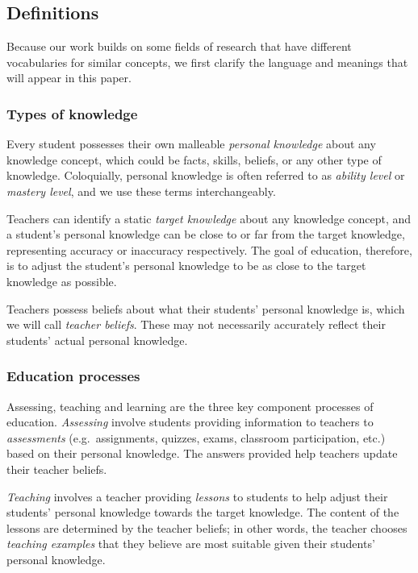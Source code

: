 \documentclass[10pt, letterpaper]{apa6}
\begin{document}
\subsection{Definitions}\label{definitions}

Because our work builds on some fields of research that have different
vocabularies for similar concepts, we first clarify the language and
meanings that will appear in this paper.

\subsubsection{Types of knowledge}\label{types-of-knowledge}

Every student possesses their own malleable \emph{personal knowledge}
about any knowledge concept, which could be facts, skills, beliefs, or
any other type of knowledge. Coloquially, personal knowledge is often
referred to as \emph{ability level} or \emph{mastery level}, and we use
these terms interchangeably.

Teachers can identify a static \emph{target knowledge} about any
knowledge concept, and a student's personal knowledge can be close to or
far from the target knowledge, representing accuracy or inaccuracy
respectively. The goal of education, therefore, is to adjust the
student's personal knowledge to be as close to the target knowledge as
possible.

Teachers possess beliefs about what their students' personal knowledge
is, which we will call \emph{teacher beliefs}. These may not necessarily
accurately reflect their students' actual personal knowledge.

\subsubsection{Education processes}\label{education-processes}

Assessing, teaching and learning are the three key component processes
of education. \emph{Assessing} involve students providing information to
teachers to \emph{assessments} (e.g.~assignments, quizzes, exams,
classroom participation, etc.) based on their personal knowledge. The
answers provided help teachers update their teacher beliefs.

\emph{Teaching} involves a teacher providing \emph{lessons} to students
to help adjust their students' personal knowledge towards the target
knowledge. The content of the lessons are determined by the teacher
beliefs; in other words, the teacher chooses \emph{teaching examples}
that they believe are most suitable given their students' personal
knowledge.
\end{document}
